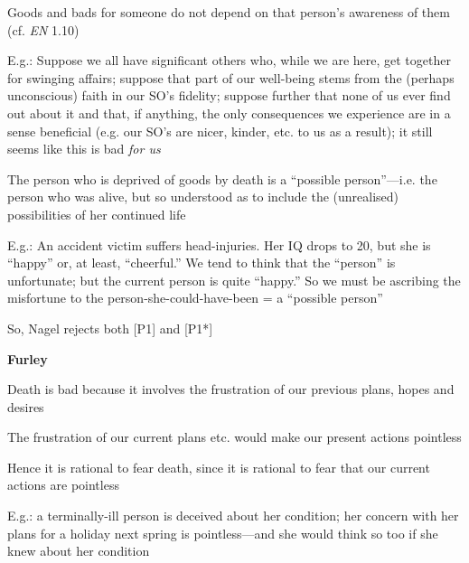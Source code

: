 \documentclass[11pt]{article}
\begin{document}
\noindent [2] Goods and bads for someone do not depend on that person's awareness of them (cf. \emph{EN} 1.10)
\vspace*{1mm}

\noindent E.g.: Suppose we all have significant others who, while we are here, get together for swinging affairs; suppose that part of our well-being stems from the (perhaps unconscious) faith in our SO's fidelity; suppose further that none of us ever find out about it and that, if anything, the only consequences we experience are in a sense beneficial (e.g. our SO's are nicer, kinder, etc. to us as a result); it still seems like this is bad \emph{for us}
\vspace*{2mm}

\noindent [3] The person who is deprived of goods by death is a ``possible person''---i.e. the person who was alive, but so understood as to include the (unrealised) possibilities of her continued life
\vspace*{1mm}

\noindent E.g.: An accident victim suffers head-injuries. Her IQ drops to 20, but she is ``happy'' or, at least, ``cheerful.'' We tend to think that the ``person'' is unfortunate; but the current person is quite ``happy.'' So we must be ascribing the misfortune to the person-she-could-have-been = a ``possible person''
\vspace*{2mm}

\noindent So, Nagel rejects both [P1] and [P1*]
\vspace*{5mm}

\noindent \textbf{Furley}
\vspace*{2mm}

\noindent [1] Death is bad because it involves the frustration of our previous plans, hopes and desires
\vspace*{1mm}

\noindent [2] The frustration of our current plans etc. would make our present actions pointless
\vspace*{1mm}

\noindent [3] Hence it is rational to fear death, since it is rational to fear that our current actions are pointless
\vspace*{1mm}

\noindent E.g.: a terminally-ill person is deceived about her condition; her concern with her plans for a holiday next spring is pointless---and she would think so too if she knew about her condition
\vspace*{2mm}
\end{document}
